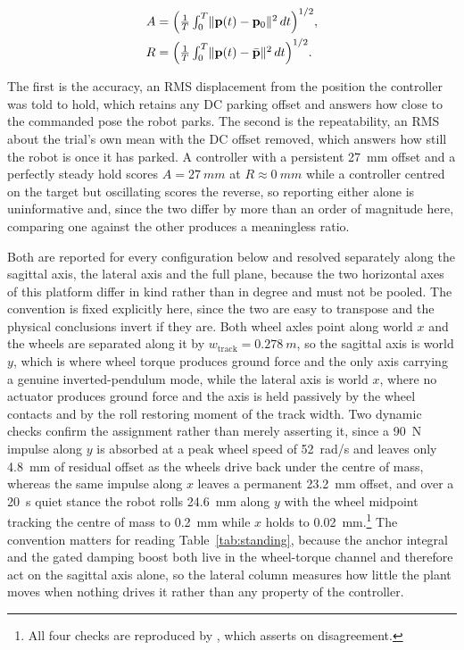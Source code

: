 \documentclass[a4paper,fleqn]{cas-dc}
\begin{document}
\begin{align}
A &= \Bigl(\tfrac{1}{T}\textstyle\int_0^T \lVert\mathbf{p}(t)-\mathbf{p}_0\rVert^2\,dt\Bigr)^{1/2},
\label{eq:accuracy}\\
R &= \Bigl(\tfrac{1}{T}\textstyle\int_0^T \lVert\mathbf{p}(t)-\bar{\mathbf{p}}\rVert^2\,dt\Bigr)^{1/2}.
\label{eq:repeatability}
\end{align}

The first is the accuracy, an RMS displacement from the position the controller
was told to hold, which retains any DC parking offset and answers how close to
the commanded pose the robot parks. The second is the repeatability, an RMS about
the trial's own mean with the DC offset removed, which answers how still the
robot is once it has parked. A controller with a persistent \SI{27}{mm} offset
and a perfectly steady hold scores $A{=}\SI{27}{mm}$ at $R{\approx}\SI{0}{mm}$
while a controller centred on the target but oscillating scores the reverse, so
reporting either alone is uninformative and, since the two differ by more than an
order of magnitude here, comparing one against the other produces a meaningless
ratio.

Both are reported for every configuration below and resolved separately along
the sagittal axis, the lateral axis and the full plane, because the two
horizontal axes of this platform differ in kind rather than in degree and must
not be pooled. The convention is fixed explicitly here, since the two are easy to
transpose and the physical conclusions invert if they are. Both wheel axles point
along world $x$ and the wheels are separated along it by
$w_{\text{track}}{=}\SI{0.278}{m}$, so the sagittal axis is world $y$, which is
where wheel torque produces ground force and the only axis carrying a genuine
inverted-pendulum mode, while the lateral axis is world $x$, where no actuator
produces ground force and the axis is held passively by the wheel contacts and by
the roll restoring moment of the track width. Two dynamic checks confirm the
assignment rather than merely asserting it, since a \SI{90}{N} impulse along $y$
is absorbed at a peak wheel speed of \SI{52}{rad/s} and leaves only \SI{4.8}{mm}
of residual offset as the wheels drive back under the centre of mass, whereas the
same impulse along $x$ leaves a permanent \SI{23.2}{mm} offset, and over a
\SI{20}{s} quiet stance the robot rolls \SI{24.6}{mm} along $y$ with the wheel
midpoint tracking the centre of mass to \SI{0.2}{mm} while $x$ holds to
\SI{0.02}{mm}.\footnote{All four checks are reproduced by
, which asserts on disagreement.} The
convention matters for reading Table~\ref{tab:standing}, because the anchor
integral and the gated damping boost both live in the wheel-torque channel and
therefore act on the sagittal axis alone, so the lateral column measures how
little the plant moves when nothing drives it rather than any property of the
controller.
\end{document}
